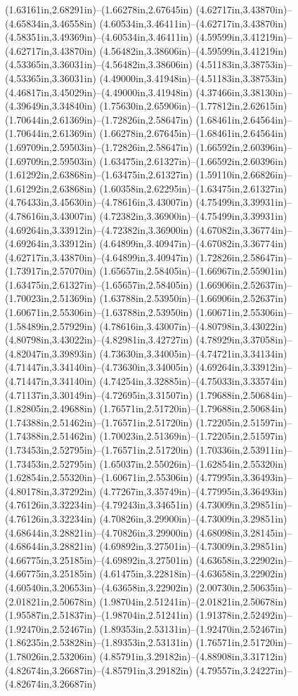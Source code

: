 (1.63161in,2.68291in)--(1.66278in,2.67645in) (4.62717in,3.43870in)--(4.65834in,3.46558in) (4.60534in,3.46411in)--(4.62717in,3.43870in) (4.58351in,3.49369in)--(4.60534in,3.46411in) (4.59599in,3.41219in)--(4.62717in,3.43870in) (4.56482in,3.38606in)--(4.59599in,3.41219in) (4.53365in,3.36031in)--(4.56482in,3.38606in) (4.51183in,3.38753in)--(4.53365in,3.36031in) (4.49000in,3.41948in)--(4.51183in,3.38753in) (4.46817in,3.45029in)--(4.49000in,3.41948in) (4.37466in,3.38130in)--(4.39649in,3.34840in) (1.75630in,2.65906in)--(1.77812in,2.62615in) (1.70644in,2.61369in)--(1.72826in,2.58647in) (1.68461in,2.64564in)--(1.70644in,2.61369in) (1.66278in,2.67645in)--(1.68461in,2.64564in) (1.69709in,2.59503in)--(1.72826in,2.58647in) (1.66592in,2.60396in)--(1.69709in,2.59503in) (1.63475in,2.61327in)--(1.66592in,2.60396in) (1.61292in,2.63868in)--(1.63475in,2.61327in) (1.59110in,2.66826in)--(1.61292in,2.63868in) (1.60358in,2.62295in)--(1.63475in,2.61327in) (4.76433in,3.45630in)--(4.78616in,3.43007in) (4.75499in,3.39931in)--(4.78616in,3.43007in) (4.72382in,3.36900in)--(4.75499in,3.39931in) (4.69264in,3.33912in)--(4.72382in,3.36900in) (4.67082in,3.36774in)--(4.69264in,3.33912in) (4.64899in,3.40947in)--(4.67082in,3.36774in) (4.62717in,3.43870in)--(4.64899in,3.40947in) (1.72826in,2.58647in)--(1.73917in,2.57070in) (1.65657in,2.58405in)--(1.66967in,2.55901in) (1.63475in,2.61327in)--(1.65657in,2.58405in) (1.66906in,2.52637in)--(1.70023in,2.51369in) (1.63788in,2.53950in)--(1.66906in,2.52637in) (1.60671in,2.55306in)--(1.63788in,2.53950in) (1.60671in,2.55306in)--(1.58489in,2.57929in) (4.78616in,3.43007in)--(4.80798in,3.43022in) (4.80798in,3.43022in)--(4.82981in,3.42727in) (4.78929in,3.37058in)--(4.82047in,3.39893in) (4.73630in,3.34005in)--(4.74721in,3.34134in) (4.71447in,3.34140in)--(4.73630in,3.34005in) (4.69264in,3.33912in)--(4.71447in,3.34140in) (4.74254in,3.32885in)--(4.75033in,3.33574in) (4.71137in,3.30149in)--(4.72695in,3.31507in) (1.79688in,2.50684in)--(1.82805in,2.49688in) (1.76571in,2.51720in)--(1.79688in,2.50684in) (1.74388in,2.51462in)--(1.76571in,2.51720in) (1.72205in,2.51597in)--(1.74388in,2.51462in) (1.70023in,2.51369in)--(1.72205in,2.51597in) (1.73453in,2.52795in)--(1.76571in,2.51720in) (1.70336in,2.53911in)--(1.73453in,2.52795in) (1.65037in,2.55026in)--(1.62854in,2.55320in) (1.62854in,2.55320in)--(1.60671in,2.55306in) (4.77995in,3.36493in)--(4.80178in,3.37292in) (4.77267in,3.35749in)--(4.77995in,3.36493in) (4.76126in,3.32234in)--(4.79243in,3.34651in) (4.73009in,3.29851in)--(4.76126in,3.32234in) (4.70826in,3.29900in)--(4.73009in,3.29851in) (4.68644in,3.28821in)--(4.70826in,3.29900in) (4.68098in,3.28145in)--(4.68644in,3.28821in) (4.69892in,3.27501in)--(4.73009in,3.29851in) (4.66775in,3.25185in)--(4.69892in,3.27501in) (4.63658in,3.22902in)--(4.66775in,3.25185in) (4.61475in,3.22818in)--(4.63658in,3.22902in) (4.60540in,3.20653in)--(4.63658in,3.22902in) (2.00730in,2.50635in)--(2.01821in,2.50678in) (1.98704in,2.51241in)--(2.01821in,2.50678in) (1.95587in,2.51837in)--(1.98704in,2.51241in) (1.91378in,2.52492in)--(1.92470in,2.52467in) (1.89353in,2.53131in)--(1.92470in,2.52467in) (1.86235in,2.53828in)--(1.89353in,2.53131in) (1.76571in,2.51720in)--(1.78026in,2.53206in) (4.85791in,3.29182in)--(4.88908in,3.31712in) (4.82674in,3.26687in)--(4.85791in,3.29182in) (4.79557in,3.24227in)--(4.82674in,3.26687in) 